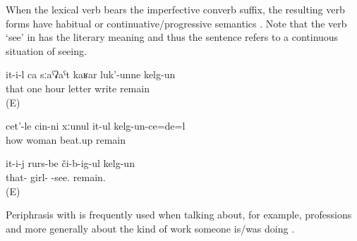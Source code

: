 When the lexical verb bears the imperfective converb suffix, the resulting verb forms have habitual or continuative\slash progressive semantics . Note that the verb `see' in  has the literary meaning and thus the sentence refers to a continuous situation of seeing.
%
\begin{exe}
	\ex	\label{ex:‎He wrote the letter in one hour}
	\gll	it-i-l	ca	sːaˁʡaˁt	kaʁar	luk'-unne	kelg-un\\
		that	one	hour	letter	write	remain\\
	\glt	{} (E)

	\ex	\label{ex:[When the man was in prison he remembered a lot], how he constantly beat up his wife}
	\gll	cet'-le	cin-ni	xːunul	it-ul	kelg-un-ce=de=l\\
		how		woman	beat.up	remain\\
	\glt	{}

	\ex	\label{‎‎He was seeing the girls.}
	\gll it-i-j	rurs-be	či-b-ig-ul	kelg-un\\
	that-	girl-	-see.	remain.\\
	\glt {} (E)
\end{exe}
	
Periphrasis with  is frequently used when talking about, for example, professions and more generally about the kind of work someone is/was doing .	
	

